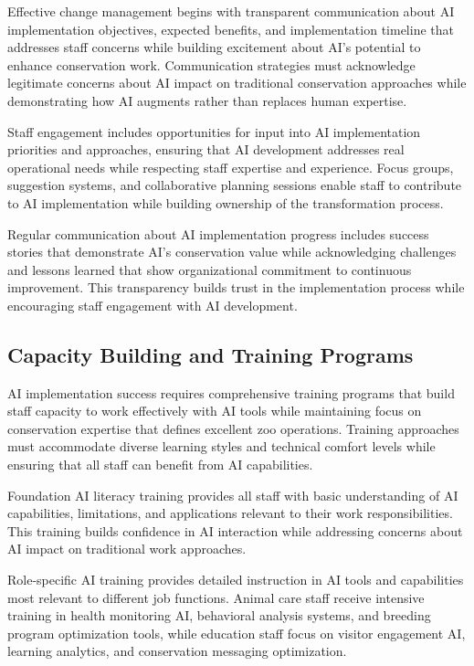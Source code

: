 \documentclass[
  Letterpaper,
]{scrbook}
\begin{document}
Effective change management begins with transparent communication about
AI implementation objectives, expected benefits, and implementation
timeline that addresses staff concerns while building excitement about
AI's potential to enhance conservation work. Communication strategies
must acknowledge legitimate concerns about AI impact on traditional
conservation approaches while demonstrating how AI augments rather than
replaces human expertise.

Staff engagement includes opportunities for input into AI implementation
priorities and approaches, ensuring that AI development addresses real
operational needs while respecting staff expertise and experience. Focus
groups, suggestion systems, and collaborative planning sessions enable
staff to contribute to AI implementation while building ownership of the
transformation process.

Regular communication about AI implementation progress includes success
stories that demonstrate AI's conservation value while acknowledging
challenges and lessons learned that show organizational commitment to
continuous improvement. This transparency builds trust in the
implementation process while encouraging staff engagement with AI
development.

\subsection{Capacity Building and Training
Programs}\label{capacity-building-and-training-programs}

AI implementation success requires comprehensive training programs that
build staff capacity to work effectively with AI tools while maintaining
focus on conservation expertise that defines excellent zoo operations.
Training approaches must accommodate diverse learning styles and
technical comfort levels while ensuring that all staff can benefit from
AI capabilities.

Foundation AI literacy training provides all staff with basic
understanding of AI capabilities, limitations, and applications relevant
to their work responsibilities. This training builds confidence in AI
interaction while addressing concerns about AI impact on traditional
work approaches.

Role-specific AI training provides detailed instruction in AI tools and
capabilities most relevant to different job functions. Animal care staff
receive intensive training in health monitoring AI, behavioral analysis
systems, and breeding program optimization tools, while education staff
focus on visitor engagement AI, learning analytics, and conservation
messaging optimization.
\end{document}
